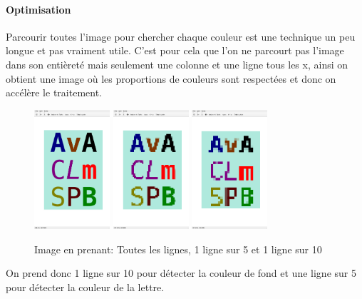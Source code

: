 \documentclass[a4paper,12pt,titlepage]{report}
\begin{document}
	\paragraph{Optimisation}
	Parcourir toutes l'image pour chercher chaque couleur est une technique un peu longue et pas vraiment utile. C'est pour cela que l'on ne parcourt pas l'image dans son entièreté mais seulement une colonne et une ligne tous les x, ainsi on obtient une image où les proportions de couleurs sont respectées et donc on accélère le traitement.
	\begin{figure}[h]
	\centering
		\includegraphics[width=0.25\textwidth]{../illus/1s1.png}
		\includegraphics[width=0.25\textwidth]{../illus/1s5.png}
		\includegraphics[width=0.25\textwidth]{../illus/1s10.png}
		\caption{Image en prenant: Toutes les lignes, 1 ligne sur 5 et 1 ligne sur 10}
	\end{figure}
	On prend donc 1 ligne sur 10 pour détecter la couleur de fond et une ligne sur 5 pour détecter la couleur de la lettre.
\end{document}
